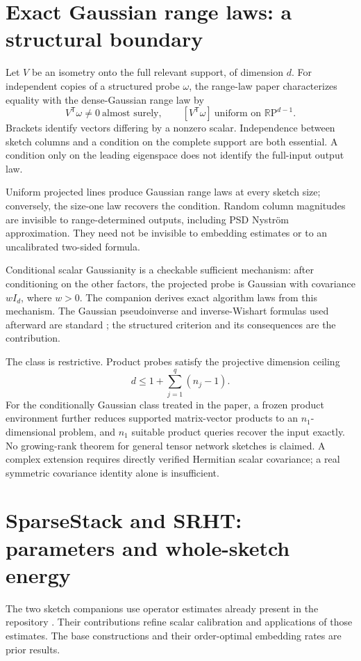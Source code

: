 \documentclass[11pt,a4paper]{article}
\begin{document}
\section{Exact Gaussian range laws: a structural boundary}
Let $V$ be an isometry onto the full relevant support, of dimension $d$.
For independent copies of a structured probe $\omega$, the range-law paper
\cite{Range} characterizes equality with the dense-Gaussian range law by
\begin{equation}\label{eq:line}
 V^\mathsf T\omega\ne0\ \text{almost surely},\qquad
 [V^\mathsf T\omega]\ \text{uniform on }\mathbb R\mathrm P^{d-1}.
\end{equation}
Brackets identify vectors differing by a nonzero scalar. Independence
between sketch columns and a condition on the complete support are both
essential. A condition only on the leading eigenspace does not identify
the full-input output law.

Uniform projected lines produce Gaussian range laws at every sketch size;
conversely, the size-one law recovers the condition. Random column
magnitudes are invisible to range-determined outputs, including PSD
Nystr\"om approximation. They need not be invisible to embedding estimates
or to an uncalibrated two-sided formula.

Conditional scalar Gaussianity is a checkable sufficient mechanism: after
conditioning on the other factors, the projected probe is Gaussian with
covariance $wI_d$, where $w>0$. The companion derives exact algorithm laws
from this mechanism. The Gaussian pseudoinverse and inverse-Wishart
formulas used afterward are standard \cite{HMT}; the structured criterion
and its consequences are the contribution.

The class is restrictive. Product probes satisfy the projective dimension
ceiling
\[
 d\le1+\sum_{j=1}^q(n_j-1).
\]
For the conditionally Gaussian class treated in the paper, a frozen product
environment further reduces supported matrix-vector products to an
$n_1$-dimensional problem, and $n_1$ suitable product queries recover the
input exactly. No growing-rank theorem for general tensor network sketches
is claimed. A complex extension requires directly verified Hermitian scalar
covariance; a real symmetric covariance identity alone is insufficient.

\section{SparseStack and SRHT: parameters and whole-sketch energy}
The two sketch companions \cite{Sparse,Hadamard} use operator estimates
already present in the repository \cite{GMO,Hybrid}. Their contributions
refine scalar calibration and applications of those estimates. The base
constructions and their order-optimal embedding rates are prior results.
\end{document}
